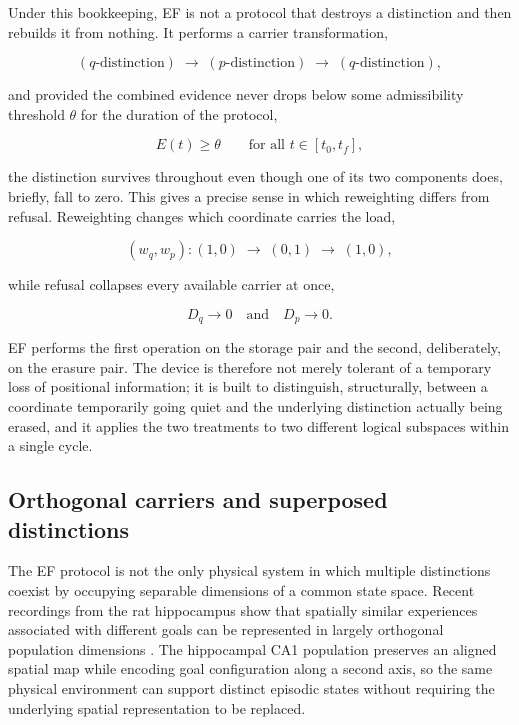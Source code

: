 \documentclass[11pt]{article}
\begin{document}
Under this bookkeeping, EF is not a protocol that destroys a distinction and then rebuilds it from nothing. It performs a carrier transformation,

\[
(q\text{-distinction}) \;\longrightarrow\; (p\text{-distinction}) \;\longrightarrow\; (q\text{-distinction}),
\]

and provided the combined evidence never drops below some admissibility threshold $\theta$ for the duration of the protocol,

\[
E(t)\ge\theta \qquad \text{for all } t\in[t_0,t_f],
\]

the distinction survives throughout even though one of its two components does, briefly, fall to zero. This gives a precise sense in which reweighting differs from refusal. Reweighting changes which coordinate carries the load,

\[
(w_q,w_p): (1,0)\;\to\;(0,1)\;\to\;(1,0),
\]

while refusal collapses every available carrier at once,

\[
D_q\to0 \quad\text{and}\quad D_p\to0.
\]

EF performs the first operation on the storage pair and the second, deliberately, on the erasure pair. The device is therefore not merely tolerant of a temporary loss of positional information; it is built to distinguish, structurally, between a coordinate temporarily going quiet and the underlying distinction actually being erased, and it applies the two treatments to two different logical subspaces within a single cycle.

\subsection{Orthogonal carriers and superposed distinctions}

The EF protocol is not the only physical system in which multiple distinctions coexist by occupying separable dimensions of a common state space. Recent recordings from the rat hippocampus show that spatially similar experiences associated with different goals can be represented in largely orthogonal population dimensions \cite{GolipourEtAl2026}. The hippocampal CA1 population preserves an aligned spatial map while encoding goal configuration along a second axis, so the same physical environment can support distinct episodic states without requiring the underlying spatial representation to be replaced.
\end{document}

